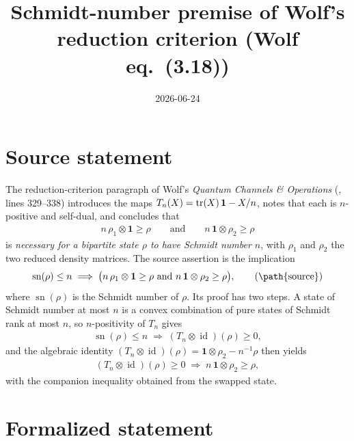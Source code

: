 \documentclass{article}
\title{Schmidt-number premise of Wolf's reduction criterion (Wolf eq.~(3.18))}
\author{}
\date{2026-06-24}
\begin{document}
\maketitle
{}

\section{Source statement}

The reduction-criterion paragraph of Wolf's \emph{Quantum Channels \&
Operations} (,
lines 329--338) introduces the maps $T_n(X)=\operatorname{tr}(X)\,\mathbf 1-X/n$, notes that
each is $n$-positive and self-dual, and concludes that
\begin{align}
  n\,\rho_1\otimes\mathbf 1\ge\rho
  \qquad\text{and}\qquad
  n\,\mathbf 1\otimes\rho_2\ge\rho
  \tag{3.18}
\end{align}
is \emph{necessary for a bipartite state $\rho$ to have Schmidt number $n$},
with $\rho_1$ and $\rho_2$ the two reduced density matrices. The source assertion
is the implication
\begin{align}
  \operatorname{sn}(\rho)\le n
  \;\Longrightarrow\;
  \bigl(n\,\rho_1\otimes\mathbf 1\ge\rho\ \text{and}\
  n\,\mathbf 1\otimes\rho_2\ge\rho\bigr),
  \tag{\path{source}}
\end{align}
where $\operatorname{sn}(\rho)$ is the Schmidt number of $\rho$. Its proof has
two steps. A state of Schmidt number at most $n$ is a convex combination of
pure states of Schmidt rank at most $n$, so $n$-positivity of $T_n$ gives
\begin{align}
  \operatorname{sn}(\rho)\le n
  \;\Longrightarrow\;
  (T_n\otimes\operatorname{id})(\rho)\ge 0,
  \tag{step 1}
\end{align}
and the algebraic identity $(T_n\otimes\operatorname{id})(\rho)=\mathbf 1\otimes\rho_2-n^{-1}\rho$
then yields
\begin{align}
  (T_n\otimes\operatorname{id})(\rho)\ge 0
  \;\Longrightarrow\;
  n\,\mathbf 1\otimes\rho_2\ge\rho,
  \tag{step 2}
\end{align}
with the companion inequality obtained from the swapped state.

\section{Formalized statement}
\end{document}
